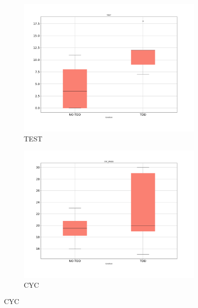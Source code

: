 \begin{figure}[H]
    \begin{subfigure}{0.5\textwidth}
        \includegraphics[width=\linewidth]{figures/box_plots/task3/TEST.png}
        \caption{TEST}
        \label{bp_task3_test}
    \end{subfigure}\hfil
    \begin{subfigure}{0.5\textwidth}
        \includegraphics[width=\linewidth]{figures/box_plots/task3/CYC.png}
        \caption{CYC}
        \label{bp_task3_cyc}
    \end{subfigure}

    \medskip


\end{figure}
